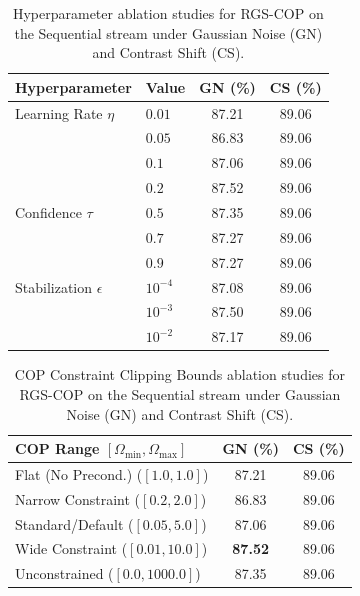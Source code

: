 \documentclass{article}
\theoremstyle{plain}
\theoremstyle{definition}
\theoremstyle{remark}
\begin{document}
\begin{table}[h]
\caption{Hyperparameter ablation studies for RGS-COP on the Sequential stream under Gaussian Noise (GN) and Contrast Shift (CS).}
\label{tab:ablations}
\vskip 0.15in
\begin{center}
\begin{small}
\begin{sc}
\begin{tabular}{llcc}
\toprule
Hyperparameter & Value & GN (\%) & CS (\%) \\
\midrule
Learning Rate $\eta$ & $0.01$ & 87.21 & 89.06 \\
                     & $0.05$ & 86.83 & 89.06 \\
                     & $0.1$  & 87.06 & 89.06 \\
                     & $0.2$  & 87.52 & 89.06 \\
\midrule
Confidence $\tau$    & $0.5$  & 87.35 & 89.06 \\
                     & $0.7$  & 87.27 & 89.06 \\
                     & $0.9$  & 87.27 & 89.06 \\
\midrule
Stabilization $\epsilon$ & $10^{-4}$ & 87.08 & 89.06 \\
                         & $10^{-3}$ & 87.50 & 89.06 \\
                         & $10^{-2}$ & 87.17 & 89.06 \\
\bottomrule
\end{tabular}
\end{sc}
\end{small}
\end{center}
\vskip -0.1in
\end{table}

\begin{table}[h]
\caption{COP Constraint Clipping Bounds ablation studies for RGS-COP on the Sequential stream under Gaussian Noise (GN) and Contrast Shift (CS).}
\label{tab:clip_ablations}
\vskip 0.15in
\begin{center}
\begin{small}
\begin{sc}
\begin{tabular}{lcc}
\toprule
COP Range $[\Omega_{\min}, \Omega_{\max}]$ & GN (\%) & CS (\%) \\
\midrule
Flat (No Precond.) ($[1.0, 1.0]$) & 87.21 & 89.06 \\
Narrow Constraint ($[0.2, 2.0]$) & 86.83 & 89.06 \\
Standard/Default ($[0.05, 5.0]$) & 87.06 & 89.06 \\
Wide Constraint ($[0.01, 10.0]$) & \textbf{87.52} & 89.06 \\
Unconstrained ($[0.0, 1000.0]$) & 87.35 & 89.06 \\
\bottomrule
\end{tabular}
\end{sc}
\end{small}
\end{center}
\vskip -0.1in
\end{table}
\end{document}
